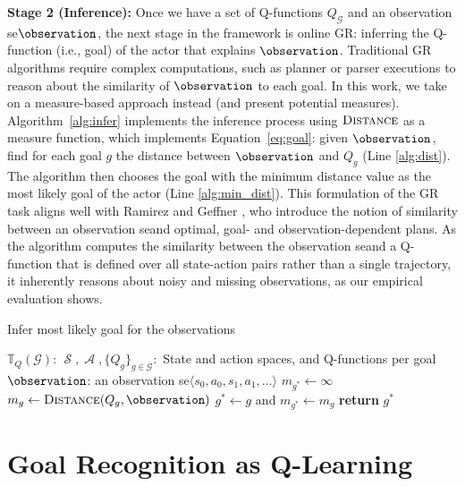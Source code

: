 \documentclass[letterpaper]{article} %
\DeclareMathOperator{\statespace}{\mathcal{S}}
\DeclareMathOperator{\actionspace}{\mathcal{A}}
\providecommand\theory{\mathbb{T}}
\providecommand\goals{\mathcal{G}}
\providecommand\goal{g}
\begin{document}
\noindent \textbf{Stage 2 (Inference):} Once we have a set of Q-functions $Q_{\goals}$ and an observation se$\observation$, the next stage in the framework is online GR: inferring the Q-function (i.e., goal) of the actor that explains $\observation$.
Traditional GR algorithms require complex computations, such as planner or parser executions to reason about the similarity of $\observation$ to each goal.
In this work, we take on a measure-based approach instead (and present potential measures).
Algorithm~\ref{alg:infer} implements the inference process using $\textsc{Distance}$ as a measure function, which implements Equation~\ref{eq:goal}: given $\observation$, find for each goal $g$ the distance between $\observation$ and $Q_g$ (Line \ref{alg:dist}).
The algorithm then chooses the goal with the minimum distance value as the most likely goal of the actor (Line \ref{alg:min_dist}).
This formulation of the GR task aligns well with Ramirez and Geffner , who introduce the notion of similarity between an observation seand optimal, goal- and observation-dependent plans.
As the algorithm computes the similarity between the observation seand a Q-function that is defined over all state-action pairs rather than a single trajectory, it inherently reasons about noisy and missing observations, as our empirical evaluation shows.


\begin{algorithm}[t]
    \caption{Infer most likely goal for the observations}
    \label{alg:infer}
\begin{algorithmic}[1]
    \Require $\theory_Q(\goals)$: $\statespace, \actionspace, \{Q_g\}_{g \in \goals}:$ State and action spaces, and Q-functions per goal
    \Require $\observation$: an observation se$\langle s_0, a_0, s_1, a_1, \ldots \rangle$
    \State $m_{g^*} \gets \infty$ 
    \ForAll{$\goal \in \goals$} 
        \State $m_g \gets \Call{Distance}{Q_g, \observation}$ 
        \label{alg:dist}
            \State $g^* \gets g$ and $m_{g^*} \gets m_g$
        \EndIf
    \EndFor
    \State \textbf{return} $g^*$
    \label{alg:min_dist}
\end{algorithmic}
\end{algorithm}


\section{Goal Recognition as Q-Learning}
\label{sec:graql}
\end{document}
